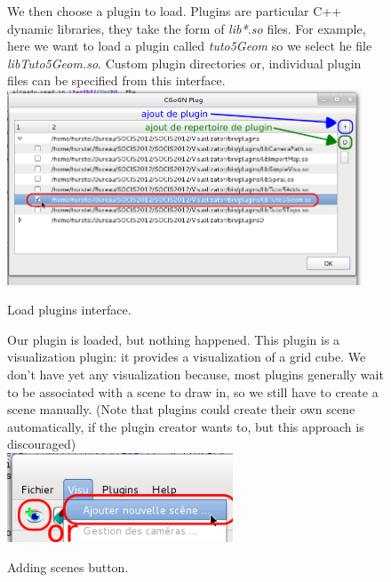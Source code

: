\documentclass[a4paper]{scrreprt}
\begin{document}
	\begin{figure}[h!p]
	We then choose a plugin to load. Plugins are particular C++ dynamic libraries,
	they take the form of \textit{lib*.so} files. For example, here we want to load
	a plugin called \textit{tuto5Geom} so we select he file \textit{libTuto5Geom.so}.
	Custom plugin directories or, individual plugin files can be specified from
	this interface.\\
	  \centering
	    \includegraphics[width=0.95\textwidth]{images/screenshot3}
	  \caption{Load plugins interface.}
	\end{figure}
	\begin{figure}[h!p]
	Our plugin is loaded, but nothing happened. This plugin is a visualization
	plugin: it provides a visualization of a grid cube. We don't have yet any
	visualization because, most plugins generally wait to be associated with a
	scene to draw in, so we still have to create a scene manually. (Note that
	plugins could create their own scene automatically, if the plugin creator
	wants to, but this approach is discouraged)\\
	  \centering
	    \includegraphics[width=0.6\textwidth]{images/screenshot4}
	  \caption{Adding scenes button.}
	\end{figure}
\end{document}
